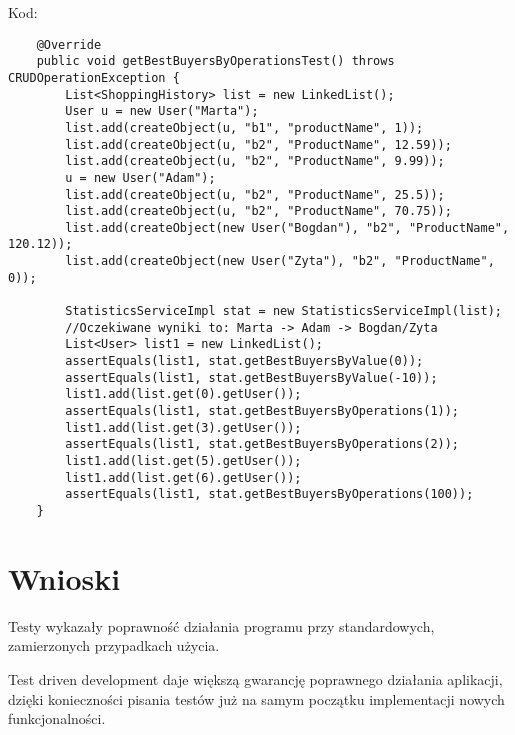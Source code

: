 \documentclass[a4paper,11pt,notitlepage]{article}
\begin{document}
Kod:
\begin{footnotesize}\begin{verbatim}
	@Override
    public void getBestBuyersByOperationsTest() throws CRUDOperationException {
        List<ShoppingHistory> list = new LinkedList();
        User u = new User("Marta");
        list.add(createObject(u, "b1", "productName", 1));
        list.add(createObject(u, "b2", "ProductName", 12.59));
        list.add(createObject(u, "b2", "ProductName", 9.99));
        u = new User("Adam");
        list.add(createObject(u, "b2", "ProductName", 25.5));
        list.add(createObject(u, "b2", "ProductName", 70.75));
        list.add(createObject(new User("Bogdan"), "b2", "ProductName", 120.12));
        list.add(createObject(new User("Zyta"), "b2", "ProductName", 0));

        StatisticsServiceImpl stat = new StatisticsServiceImpl(list);
        //Oczekiwane wyniki to: Marta -> Adam -> Bogdan/Zyta
        List<User> list1 = new LinkedList();
        assertEquals(list1, stat.getBestBuyersByValue(0));
        assertEquals(list1, stat.getBestBuyersByValue(-10));
        list1.add(list.get(0).getUser());
        assertEquals(list1, stat.getBestBuyersByOperations(1));
        list1.add(list.get(3).getUser());
        assertEquals(list1, stat.getBestBuyersByOperations(2));
        list1.add(list.get(5).getUser());
        list1.add(list.get(6).getUser());
        assertEquals(list1, stat.getBestBuyersByOperations(100));
    }
\end{verbatim}\end{footnotesize}

\section{Wnioski}
Testy wykazały poprawność działania programu przy standardowych, zamierzonych przypadkach użycia.

Test driven development daje większą gwarancję poprawnego działania aplikacji, dzięki konieczności pisania testów już na samym początku implementacji nowych funkcjonalności.
\end{document}
